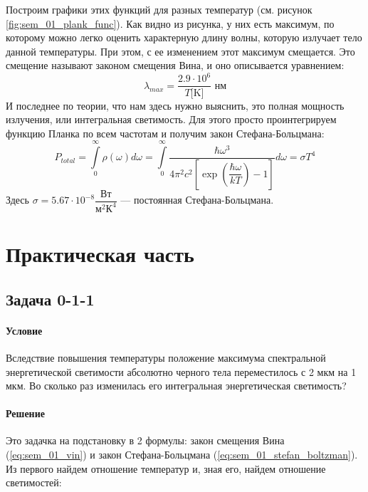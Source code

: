 \documentclass[12pt]{article}
\begin{document}
\vspace{1em} \noindent
Построим графики этих функций для разных температур (см. рисунок \ref{fig:sem_01_plank_func}). Как видно из рисунка, у них есть максимум, по которому можно легко оценить характерную длину волны, которую излучает тело данной температуры. При этом, с ее изменением этот максимум смещается. Это смещение называют законом смещения Вина, и оно описывается уравнением:
\begin{equation}
\label{eq:sem_01_vin}
    \lambda_{max} = \dfrac{2.9 \cdot 10^6}{T \text{[K]}} \text{ нм}
\end{equation}
И последнее по теории, что нам здесь нужно выяснить, это полная мощность излучения, или интегральная светимость. Для этого просто проинтегрируем функцию Планка по всем частотам и получим закон Стефана-Больцмана:
\begin{equation}
\label{eq:sem_01_stefan_boltzman}
    P_{total} =\int\limits_{0}^{\infty}\rho(\omega)d\omega = \int\limits_{0}^{\infty}\dfrac{\hbar \omega^3}{4\pi^2c^2\left[ \exp{\left(\dfrac{\hbar \omega}{kT}\right)} - 1\right]}d\omega = \sigma T^4
\end{equation}
Здесь $\sigma = 5.67 \cdot 10^{-8} \dfrac{\text{Вт}}{\text{м}^2 \text{К}^4}$ --- постоянная Стефана-Больцмана.

\section{Практическая часть}

\subsection{Задача 0-1-1}
\label{task_011}
\paragraph{Условие}
Вследствие повышения температуры положение максимума спектральной энергетической светимости абсолютно черного тела переместилось с 2 мкм на 1 мкм. Во сколько раз изменилась его интегральная энергетическая светимость?
\paragraph{Решение}
Это задачка на подстановку в 2 формулы: закон смещения Вина (\ref{eq:sem_01_vin}) и закон Стефана-Больцмана (\ref{eq:sem_01_stefan_boltzman}). Из первого найдем отношение температур и, зная его, найдем отношение светимостей: 
\end{document}
